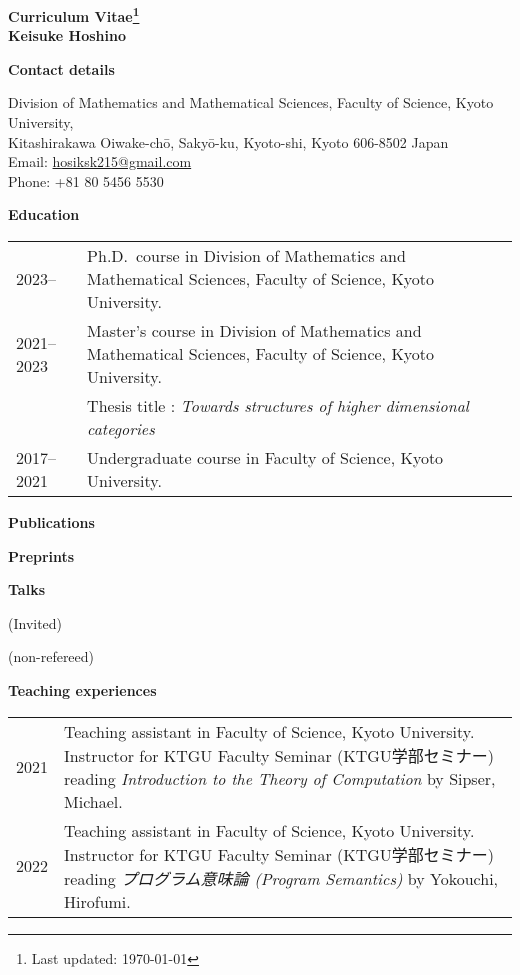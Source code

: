 \documentclass[a4paper,dvipsnames,11pt,backend=luatex]{article} %
\newcommand*{\cvsection}[1]{%
  \vspace{1.2\baselineskip}%
  {\raggedright          %
   \bfseries\large       %
   #1\par}               %
  \vspace{0.4\baselineskip}%
}
\begin{document}
\begin{center}\large\bfseries Curriculum Vitae\footnote{Last updated: \today}
\\
\rm Keisuke Hoshino
\end{center}
\noindent %
\cvsection{Contact details}
\vspace{-1em}%
\noindent %
Division of Mathematics and Mathematical Sciences, Faculty of Science, Kyoto University,
\\
Kitashirakawa Oiwake-chō, Sakyō-ku, Kyoto-shi,
Kyoto 606-8502  
Japan
\\
Email: \href{mailto:hosiksk215@gmail.com}{hosiksk215@gmail.com}
\\
Phone: +81 80 5456 5530


\cvsection{Education}
\begin{tabularx}{\textwidth}{@{}lp{140mm}}
  2023--
  &
  Ph.D.\ course in Division of Mathematics and Mathematical Sciences, Faculty of Science, Kyoto University.
  \\
  2021--2023
  &
  Master's course in Division of Mathematics and Mathematical Sciences, Faculty of Science, Kyoto University.
  \\&
  Thesis title : \textit{Towards structures of higher dimensional categories}
  \\
  2017--2021
  &
  Undergraduate course in Faculty of Science, Kyoto University.
\end{tabularx}

\cvsection{Publications}
\begin{refsection}                      %
  \nocite{*} %
  \printbibliography[heading=none,keyword=published,resetnumbers=true]
\end{refsection}

\cvsection{Preprints}
\begin{refsection}
\nocite{*} %
  \printbibliography[heading=none,keyword=preprint,resetnumbers=true]
\end{refsection}

\cvsection{Talks}
(Invited)
\begin{refsection}
\nocite{*} %
  \printbibliography[heading=none,keyword=iv-talk,resetnumbers=true]
\end{refsection}

(non-refereed)
\begin{refsection}
\nocite{*} %
  \printbibliography[heading=none,keyword=nr-talk,resetnumbers=true]
\end{refsection}

\pagebreak

\cvsection{Teaching experiences}
\begin{tabularx}{\textwidth}{@{}lp{140mm}}
  2021
  &
  Teaching assistant in Faculty of Science, Kyoto University.
  Instructor for KTGU Faculty Seminar (KTGU学部セミナー) reading \textit{Introduction to the Theory of Computation} by Sipser, Michael.
  \\
  2022
  &
  Teaching assistant in Faculty of Science, Kyoto University.
  Instructor for KTGU Faculty Seminar (KTGU学部セミナー) reading \textit{プログラム意味論 (Program Semantics) } by Yokouchi, Hirofumi.
\end{tabularx}
\end{document}
